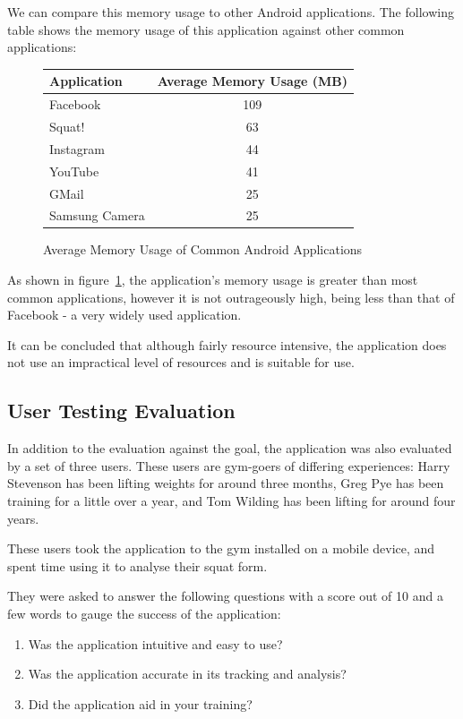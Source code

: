 We can compare this memory usage to other Android applications. The following table shows the memory usage of this application against other common applications:

\begin{figure}[H]
    \centering
	\begin{tabular}{ | l | c | }
	    \hline
	    \textbf{Application} & \textbf{Average Memory Usage (MB)} \\ \hline
	    Facebook & 109 \\ \hline
	    Squat! & 63 \\ \hline
	    Instagram & 44 \\ \hline
	    YouTube & 41 \\ \hline
	    GMail & 25 \\ \hline
	    Samsung Camera & 25 \\
	    \hline
    \end{tabular}
\caption{Average Memory Usage of Common Android Applications}
\label{fig:memusage}
\end{figure}

As shown in figure~\ref{fig:memusage}, the application's memory usage is greater than most common applications, however it is not outrageously high, being less than that of Facebook - a very widely used application.

It can be concluded that although fairly resource intensive, the application does not use an impractical level of resources and is suitable for use.

\subsection{User Testing Evaluation}
\label{sec:user_testing}
In addition to the evaluation against the goal, the application was also evaluated by a set of three users. These users are gym-goers of differing experiences: Harry Stevenson has been lifting weights for around three months, Greg Pye has been training for a little over a year, and Tom Wilding has been lifting for around four years.

These users took the application to the gym installed on a mobile device, and spent time using it to analyse their squat form.

They were asked to answer the following questions with a score out of 10 and a few words to gauge the success of the application:

\begin{enumerate}
    \item Was the application intuitive and easy to use?
    \item Was the application accurate in its tracking and analysis?
    \item Did the application aid in your training?
\end{enumerate}

